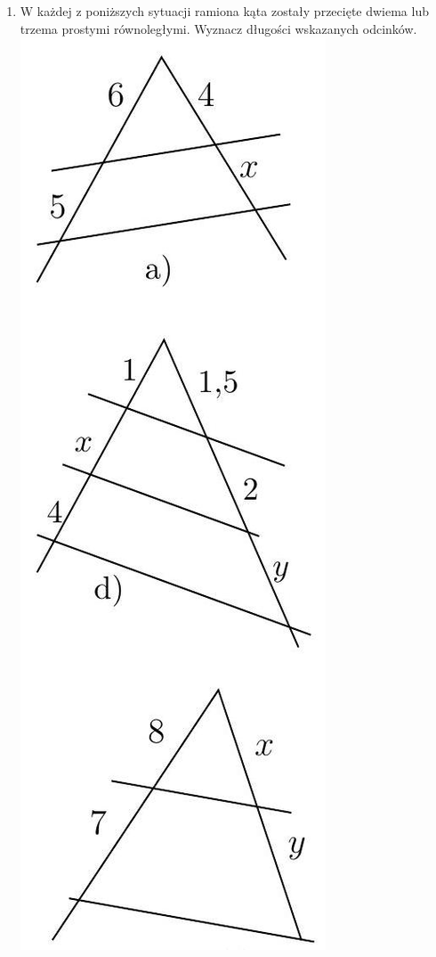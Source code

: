 \documentclass[10pt]{article}
\begin{document}
\begin{enumerate}
  \item W każdej z poniższych sytuacji ramiona kąta zostały przecięte dwiema lub trzema prostymi równoległymi. Wyznacz długości wskazanych odcinków.\\
\includegraphics[max width=\textwidth, center]{2024_11_21_e9b4faa005d5be2cc318g-007}\\

\end{enumerate}
\end{document}
